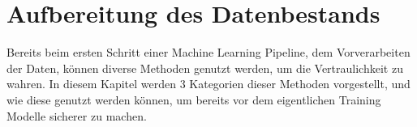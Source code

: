 \section{Aufbereitung des Datenbestands}\label{sec:aufbereitung_datensatz}

Bereits beim ersten Schritt einer Machine Learning Pipeline, dem Vorverarbeiten der Daten, können diverse Methoden genutzt werden, um die Vertraulichkeit zu wahren.
In diesem Kapitel werden 3 Kategorien dieser Methoden vorgestellt, und wie diese genutzt werden können, um bereits vor dem eigentlichen Training Modelle sicherer zu machen.




